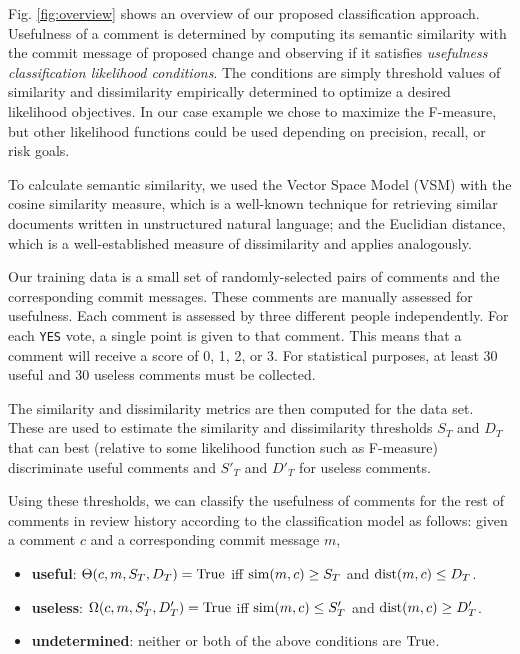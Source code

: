 Fig. \ref{fig:overview} shows an overview of our proposed classification approach.
Usefulness of a comment is determined by computing its semantic similarity with the commit message of proposed change and observing if it satisfies \emph{usefulness classification likelihood conditions}.
The conditions are simply threshold values of similarity and dissimilarity empirically determined to optimize a desired likelihood objectives.
In our case example we chose to maximize the F-measure, but other likelihood functions could be used depending on precision, recall, or risk goals.

To calculate semantic similarity, we used the Vector Space Model (VSM) with the cosine similarity measure, which is a well-known technique for retrieving similar documents written in unstructured natural language; and the Euclidian distance, which is a well-established measure of dissimilarity and applies analogously.

Our training data is a small set of randomly-selected pairs of comments and the corresponding commit messages.
These comments are manually assessed for usefulness.
Each comment is assessed by three different people independently.
For each \texttt{YES} vote, a single point is given to that comment.
This means that a comment will receive a score of 0, 1, 2, or 3.
For statistical purposes, at least 30 useful and 30 useless comments must be collected.

The similarity and dissimilarity metrics are then computed for the data set.
These are used to estimate the similarity and dissimilarity thresholds $S_T$ and $D_T$ that can best (relative to some likelihood function such as F-measure) discriminate useful comments and $S'_T$ and $D'_T$ for useless comments.

Using these thresholds, we can classify the usefulness of comments for the rest of comments in review history according to the classification model as follows: given a comment $c$ and a corresponding commit message $m$,
\begin{itemize}
\item \textbf{useful}: $\Theta(c,m,S_T,D_T) = \operatorname{True}$ iff $\operatorname{sim}(m,c) \geq S_T$ and $\operatorname{dist}(m,c) \leq D_T$.
\item \textbf{useless}: $\Omega(c,m,S'_T,D'_T) = \operatorname{True}$ iff $\operatorname{sim}(m,c) \leq  S'_T$ and $\operatorname{dist}(m,c) \geq D'_T$.
\item \textbf{undetermined}: neither or both of the above conditions are $\operatorname{True}$.
\end{itemize}


